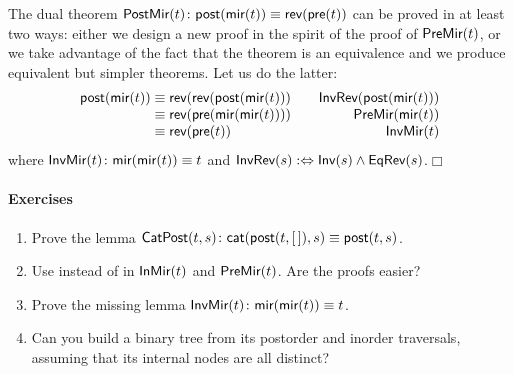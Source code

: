 The dual theorem \(\textsf{PostMir}({t})
\colon \textsf{post}(\textsf{mir}(t)) \equiv
\textsf{rev}(\textsf{pre}(t))\)
 
 can be proved in at least two ways: either we
design a new proof in the spirit of the proof of \(\textsf{PreMir}({t})\),
or we take advantage of the fact that the theorem is an equivalence
and we produce equivalent but simpler theorems. Let us do the latter:
\begin{equation*}
  \begin{array}{@{}r@{\;}c@{\;}l@{\qquad}r@{}}
    \fun{post}(\fun{mir}(t))
    & \equiv
    & \fun{rev}(\fun{rev}(\fun{post}(\fun{mir}(t)))
    & \IH{\pred{InvRev}{\fun{post}(\fun{mir}(t))}}\\
    & \equiv
    & \fun{rev}(\fun{pre}(\fun{mir}(\fun{mir}(t))))
    & \IH{\pred{PreMir}{\fun{mir}(t)}}\\
    & \equiv
    & \fun{rev}(\fun{pre}(t))
    & \IH{\pred{InvMir}{t}}
  \end{array}
\end{equation*}
where \(\textsf{InvMir}({t}) \colon
\textsf{mir}(\textsf{mir}(t)) \equiv t\) and
\(\textsf{InvRev}({s}) :\Leftrightarrow \textsf{Inv}({s}) \wedge
\textsf{EqRev}({s})\).\hfill\(\Box\)

\paragraph{Exercises}
\begin{enumerate}

  \item Prove the lemma
    \(\textsf{CatPost}({t,s}) \colon \textsf{cat}(\textsf{post}(t,[\,]),s) \equiv
    \textsf{post}(t,s)\).

  \item Use  instead of  in
  \(\textsf{InMir}({t})\) and \(\textsf{PreMir}({t})\). Are the proofs easier?

  \item Prove the missing lemma
  \(\textsf{InvMir}({t}) \colon \textsf{mir}(\textsf{mir}(t)) \equiv
  t\).\label{ex:mir_mir}

  \item Can you build a binary tree from its postorder and inorder
    traversals, assuming that its internal nodes are all distinct?

\end{enumerate}

